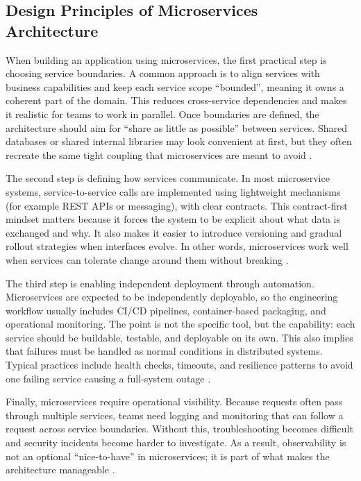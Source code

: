 \subsection{Design Principles of Microservices Architecture}
\label{sec:microservices-principles}
When building an application using microservices, the first practical step is choosing service boundaries. A common approach is to align services with business capabilities and keep each service scope “bounded”, meaning it owns a coherent part of the domain. This reduces cross-service dependencies and makes it realistic for teams to work in parallel. Once boundaries are defined, the architecture should aim for “share as little as possible” between services. Shared databases or shared internal libraries may look convenient at first, but they often recreate the same tight coupling that microservices are meant to avoid \cite{BaresiGarriga2020}.
\vspace{0.5cm}

The second step is defining how services communicate. In most microservice systems, service-to-service calls are implemented using lightweight mechanisms (for example REST APIs or messaging), with clear contracts. This contract-first mindset matters because it forces the system to be explicit about what data is exchanged and why. It also makes it easier to introduce versioning and gradual rollout strategies when interfaces evolve. In other words, microservices work well when services can tolerate change around them without breaking \cite{BaresiGarriga2020}.
\vspace{0.5cm}

The third step is enabling independent deployment through automation. Microservices are expected to be independently deployable, so the engineering workflow usually includes CI/CD pipelines, container-based packaging, and operational monitoring. The point is not the specific tool, but the capability: each service should be buildable, testable, and deployable on its own. This also implies that failures must be handled as normal conditions in distributed systems. Typical practices include health checks, timeouts, and resilience patterns to avoid one failing service causing a full-system outage \cite{AbdelfattahCerny2022,Yarygina2018}.
\vspace{0.5cm}

Finally, microservices require operational visibility. Because requests often pass through multiple services, teams need logging and monitoring that can follow a request across service boundaries. Without this, troubleshooting becomes difficult and security incidents become harder to investigate. As a result, observability is not an optional “nice-to-have” in microservices; it is part of what makes the architecture manageable \cite{AbdelfattahCerny2022}.

